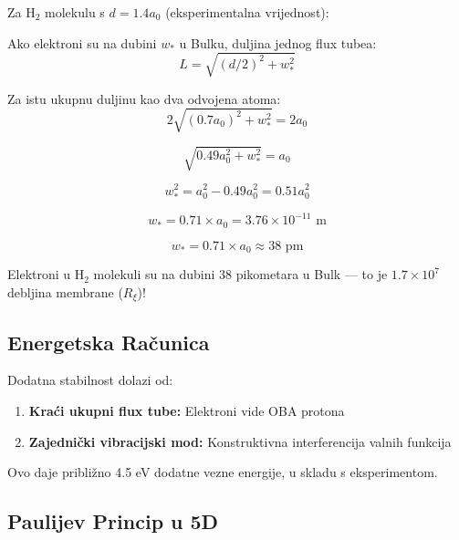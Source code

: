 \documentclass[12pt,a4paper]{article}
\begin{document}
Za H$_2$ molekulu s $d = 1.4 a_0$ (eksperimentalna vrijednost):

Ako elektroni su na dubini $w_*$ u Bulku, duljina jednog flux tubea:
\begin{equation}
L = \sqrt{(d/2)^2 + w_*^2}
\end{equation}

Za istu ukupnu duljinu kao dva odvojena atoma:
\begin{equation}
2 \sqrt{(0.7 a_0)^2 + w_*^2} = 2 a_0
\end{equation}

\begin{equation}
\sqrt{0.49 a_0^2 + w_*^2} = a_0
\end{equation}

\begin{equation}
w_*^2 = a_0^2 - 0.49 a_0^2 = 0.51 a_0^2
\end{equation}

\begin{equation}
w_* = 0.71 \times a_0 = 3.76 \times 10^{-11} \text{ m}
\end{equation}

\begin{keyresult}
\begin{equation}
\boxed{w_* = 0.71 \times a_0 \approx 38 \text{ pm}}
\end{equation}

Elektroni u H$_2$ molekuli su na dubini 38 pikometara u Bulk — to je $1.7 \times 10^7$ debljina membrane ($R_\xi$)!
\end{keyresult}

\subsection{Energetska Računica}

Dodatna stabilnost dolazi od:

\begin{enumerate}
    \item \textbf{Kraći ukupni flux tube:} Elektroni vide OBA protona
    \item \textbf{Zajednički vibracijski mod:} Konstruktivna interferencija valnih funkcija
\end{enumerate}

Ovo daje približno 4.5 eV dodatne vezne energije, u skladu s eksperimentom.

\subsection{Paulijev Princip u 5D}
\end{document}

